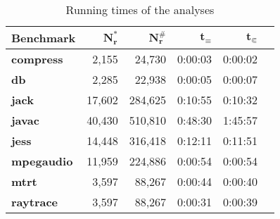 \begin{table}[h]
\caption{Running times of the analyses}\label{tab:runtimes}
\centering
\setlength{\tabcolsep}{2ex}
\begin{tabular}{lrrrrr}
\toprule
\textbf{Benchmark}   & $\bm{N^*_r}$ & $\bm{N^\#_r}$ & $\bm{t_\equiv}$ & $\bm{t_{\Subset}}$ \\ \midrule
\textbf{compress}    & 2,155        & 24,730        & 0:00:03         & 0:00:02            \\
\textbf{db}          & 2,285        & 22,938        & 0:00:05         & 0:00:07            \\
\textbf{jack}        & 17,602       & 284,625       & 0:10:55         & 0:10:32            \\
\textbf{javac}       & 40,430       & 510,810       & 0:48:30         & 1:45:57            \\
\textbf{jess}        & 14,448       & 316,418       & 0:12:11         & 0:11:51            \\
\textbf{mpegaudio}   & 11,959       & 224,886       & 0:00:54         & 0:00:54            \\
\textbf{mtrt}        & 3,597        & 88,267        & 0:00:44         &                   0:00:40 \\
\textbf{raytrace}    & 3,597        & 88,267        & 0:00:31         &                   0:00:39 \\ \bottomrule
\end{tabular}
\end{table}
